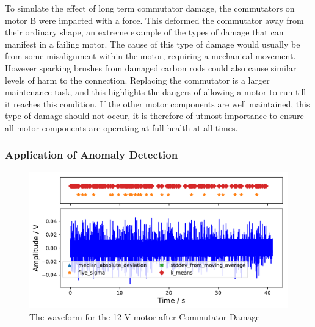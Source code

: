 To simulate the effect of long term commutator damage, the commutators on motor B were impacted with a force. This deformed the commutator away from their ordinary shape, an extreme example of the types of damage that can manifest in a failing motor. The cause of this type of damage would usually be from some misalignment within the motor, requiring a mechanical movement. However sparking brushes from damaged carbon rods could also cause similar levels of harm to the connection. Replacing the commutator is a larger maintenance task, and this highlights the dangers of allowing a motor to run till it reaches this condition. If the other motor components are well maintained, this type of damage should not occur, it is therefore of utmost importance to ensure all motor components are operating at full health at all times.  

\subsubsection{Application of Anomaly Detection}

\begin{figure}[t]
    \includegraphics[width=1.0\textwidth]{fig/12V_hammer_motornorm12V.pdf}
    \caption[Anomaly Tests 12 V Commutator Damage]{The waveform for the 12 V motor after Commutator Damage}
    \label{fig:12V_Hammer}
\end{figure}


